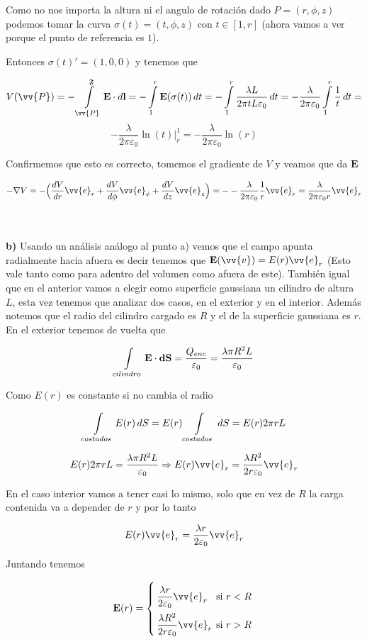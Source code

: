 \documentclass[leqno, 12pt, twoside, letterpaper]{book}
\def\efield{\textbf{E}}
\def\vdiff{\textbf{dS}}
\def\lineInt#1#2#3{\int\displaylimits_{#2}^{#3} #1 \cdot d\textbf{l}}
\begin{document}
Como no nos importa la altura ni el angulo de rotación dado $P = (r, \phi, z)$ podemos tomar la curva $\sigma(t) = (t, \phi, z)$ con $t \in [1, r]$ (ahora vamos a ver porque el punto de referencia es $1$).

Entonces $\sigma(t)' = (1, 0, 0)$ y tenemos que


$$ V(\vv{P}) = -\lineInt{\efield}{\vv{P}}{\mathfrak{F}} = - \int\displaylimits_{1}^{r} \efield(\sigma(t)) \, dt  
=  - \int\displaylimits_{1}^{r} \dfrac{\lambda L}{2\pi t L \varepsilon_0} \, dt 
=  - \dfrac{\lambda }{2\pi  \varepsilon_0} \int\displaylimits_{1}^{r} \dfrac{1}{t} \, dt = $$
$$ - \dfrac{\lambda }{2\pi  \varepsilon_0} \ln(t) \Big\rvert_{r}^{1} = - \dfrac{\lambda }{2\pi  \varepsilon_0} \ln(r) 
$$ 

Confirmemos que esto es correcto, tomemos el gradiente de $V$ y veamos que da $\efield$

$$ - \nabla V = - \Big(\dfrac{dV}{dr} \vv{e}_r + \dfrac{dV}{d\phi} \vv{e}_{\phi} + \dfrac{dV}{dz} \vv{e}_z\Big) = - - \dfrac{\lambda}{2\pi \varepsilon_0} \dfrac{1}{r} \vv{e}_r =  \dfrac{\lambda}{2\pi \varepsilon_0 r} \vv{e}_r $$

\hfill\\\hfill\\
\textbf{b)} Usando un análisis análogo al punto a) vemos que el campo apunta radialmente hacia afuera es decir tenemos que $\efield(\vv{v}) = E(r) \vv{e}_r$ (Esto vale tanto como para adentro del volumen como afuera de este). También igual que en el anterior vamos a elegir como superficie gaussiana un cilindro de altura $L$, esta vez tenemos que analizar dos casos, en el exterior y en el interior. Además notemos que el radio del cilindro cargado es $R$ y el de la superficie gaussiana es $r$. 
\hfill\\

En el exterior tenemos de vuelta que  

\[ \int\displaylimits_{cilindro} \efield \cdot \vdiff = \dfrac{Q_{enc}}{\varepsilon_0} = \dfrac{\lambda\pi R^2 L}{\varepsilon_0} \]

Como $E(r)$ es constante si no cambia el radio

\[ \int\displaylimits_{costados} E(r) \, dS = E(r) \int\displaylimits_{costados}  \, dS = E(r) 2 \pi r L\]

\[ E(r) 2 \pi r L = \dfrac{\lambda\pi R^2 L}{\varepsilon_0} \Rightarrow  E(r) \vv{e}_r = \dfrac{\lambda R^2 }{2 r \varepsilon_0} \vv{e}_r\]

En el caso interior vamos a tener casi lo mismo, solo que en vez de $R$ la carga contenida va a depender de $r$ y por lo tanto 

\[ E(r) \vv{e}_r = \dfrac{\lambda r }{2 \varepsilon_0} \vv{e}_r\]

Juntando tenemos

$$ \efield(r) = \twopartdef{\dfrac{\lambda r }{2 \varepsilon_0} \vv{e}_r}{ r < R }{\dfrac{\lambda R^2 }{2 r \varepsilon_0} \vv{e}_r}{\textrm{si } r > R} $$
\end{document}
